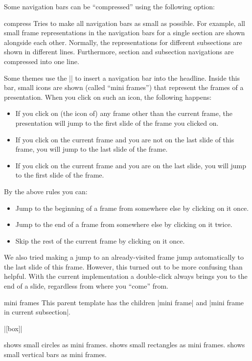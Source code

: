 Some navigation bars can be ``compressed'' using the following option:

\begin{classoption}{compress}
  Tries to make all navigation bars as small as possible. For example, all small frame representations in the navigation bars for a single section are shown alongside each other. Normally, the representations for different subsections are shown in different lines. Furthermore, section and subsection navigations are compressed into one line.
\end{classoption}

Some themes use the |\insertnavigation| to insert a navigation bar into the headline. Inside this bar, small icons are shown (called ``mini frames'') that represent the frames of a presentation. When you click on such an icon, the following happens:
\begin{itemize}
\item
  If you click on (the icon of) any frame other than the current frame, the presentation will jump to the first slide of the frame you clicked on.
\item
  If you click on the current frame and you are not on the last slide of this frame, you will jump to the last slide of the frame.
\item
  If you click on the current frame and you are on the last slide, you will jump to the first slide of the frame.
\end{itemize}

By the above rules you can:
\begin{itemize}
\item
  Jump to the beginning of a frame from somewhere else by clicking on it once.
\item
  Jump to the end of a frame from somewhere else by clicking on it twice.
\item
  Skip the rest of the current frame by clicking on it once.
\end{itemize}

We also tried making a jump to an already-visited frame jump automatically to the last slide of this frame. However, this turned out to be more confusing than helpful. With the current implementation a double-click always brings you to the end of a slide, regardless from where you ``come'' from.

\begin{element}{mini frames}\semiyes\no\no
  This parent template has the children |mini frame| and |mini frame in current subsection|.

  \example
  |[box]|

  \begin{templateoptions}
    shows small circles as mini frames.
    shows small rectangles as mini frames.
    shows small vertical bars as mini frames.
  \end{templateoptions}
\end{element}

